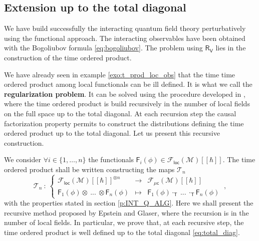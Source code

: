 \documentclass[11pt]{book}
\newcommand{\loc}{\mathsf{loc}}
\newcommand{\muc}{\mu\csf}
\newcommand{\Fcal}{\mathcal{F}}
\newcommand{\Mcal}{\mathcal{M}}
\newcommand{\Tcal}{\mathcal{T}}
\newcommand{\Fsf}{\mathsf{F}}
\newcommand{\Rsf}{\mathsf{R}}
\newcommand{\Tsf}{\mathsf{T}}
\newcommand{\Vsf}{\mathsf{V}}
\newcommand{\csf}{\mathsf{c}}
\theoremstyle{break}
\begin{document}
\subsection{Extension up to the total diagonal}
\label{p:EXT_UP_TOT}


We have build successfully the interacting quantum field theory perturbatively using the functional approach. The interacting observables have been obtained with the Bogoliubov formula \eqref{eq:bogoliubov}. The problem using $\Rsf_\Vsf$ lies in the construction of the time ordered product.


We have already seen in example \ref{exo:t_prod_loc_obs} that the time time ordered product among local functionals can be ill defined. It is what we call the \textbf{regularization problem}. It can be solved using the procedure developed in \cite{BF_2000}, where the time ordered product is build recursively in the number of local fields on the full space up to the total diagonal. At each recursion step the causal factorization property permits to construct the distributions defining the time ordered product up to the total diagonal. Let us present this recursive construction. 


\bigskip


We consider $\forall i \in \{1,\dots,n\}$ the functionals $\Fsf_i(\phi) \in \Fcal_\loc(\Mcal)[[\hbar]]$. The time ordered product shall be written constructing the maps $\Tcal_n$ 
%
\begin{equation*}
\Tcal_n \ : \ 
\left\{
\begin{array}{lcl}
\Fcal_{\loc}(\Mcal)[[\hbar]]^{\otimes n} & \to & \Fcal_{\muc}(\Mcal)[[\hbar]] \\
\Fsf_1(\phi) \otimes \ ... \ \otimes \Fsf_n(\phi) & \mapsto & \Fsf_1(\phi) \cdot_{\Tsf} \ ... \ \cdot_{\Tsf} \Fsf_n(\phi)
\end{array}
\right. \ ,
\end{equation*}
%
with the properties stated in section \ref{p:INT_Q_ALG}. Here we shall present the recursive method proposed by Epstein and Glaser, where the recursion is in the number of local fields. In particular, we prove that, at each recursive step, the time ordered product is well defined up to the total diagonal \eqref{eq:total_diag}.
\end{document}

